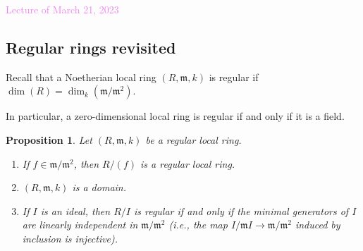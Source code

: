 \documentclass{amsart}[12pt]
\newcommand{\Mar}[1]{\textcolor{violet}{Lecture of March #1, 2023}}
\newcommand{\fm}{{\mathfrak m}}
\numberwithin{equation}{section}
\theoremstyle{plain} %
\newtheorem{prop}[equation]{Proposition}
\theoremstyle{definition}
\theoremstyle{remark}
\begin{document}
\Mar{21}

\subsection{Regular rings revisited}

Recall that a Noetherian local ring $(R,\fm,k)$ is regular if $\dim(R) = \dim_k(\fm/\fm^2)$.

In particular, a zero-dimensional local ring is regular if and only if it is a field.

\begin{prop} Let $(R,\fm,k)$ be a regular local ring.
\begin{enumerate}
\item If $f\in \fm/\fm^2$, then $R/(f)$ is a regular local ring.
\item $(R,\fm,k)$ is a domain.
\item If $I$ is an ideal, then $R/I$ is regular if and only if the minimal generators of $I$ are linearly independent in $\fm/\fm^2$ (i.e., the map $I/\fm I\to \fm/\fm^2$ induced by inclusion is injective).
\end{enumerate}
\end{prop}
\end{document}
